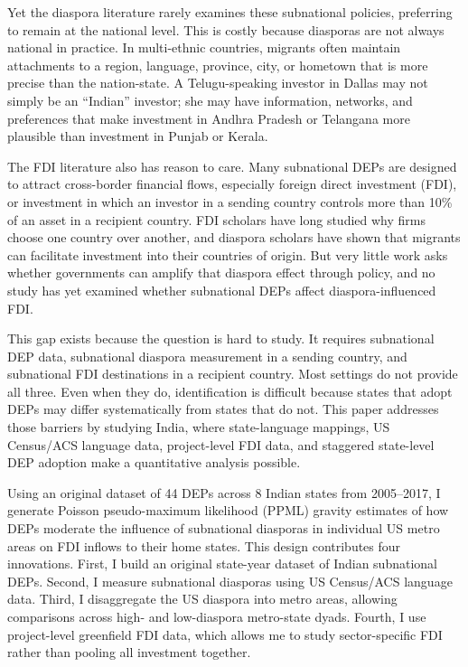 \documentclass[doublespace,nopageskip]{UVAthesis}
\begin{document}
Yet the diaspora literature rarely examines these subnational policies, preferring to remain at the national level.\citep{gazzotti_embracing_2023} This is costly because diasporas are not always national in practice. In multi-ethnic countries, migrants often maintain attachments to a region, language, province, city, or hometown that is more precise than the nation-state. A Telugu-speaking investor in Dallas may not simply be an ``Indian'' investor; she may have information, networks, and preferences that make investment in Andhra Pradesh or Telangana more plausible than investment in Punjab or Kerala.

The FDI literature also has reason to care. Many subnational DEPs are designed to attract cross-border financial flows, especially foreign direct investment (FDI), or investment in which an investor in a sending country controls more than 10\% of an asset in a recipient country. FDI scholars have long studied why firms choose one country over another, and diaspora scholars have shown that migrants can facilitate investment into their countries of origin. But very little work asks whether governments can amplify that diaspora effect through policy, and no study has yet examined whether subnational DEPs affect diaspora-influenced FDI.

This gap exists because the question is hard to study. It requires subnational DEP data, subnational diaspora measurement in a sending country, and subnational FDI destinations in a recipient country. Most settings do not provide all three. Even when they do, identification is difficult because states that adopt DEPs may differ systematically from states that do not. This paper addresses those barriers by studying India, where state-language mappings, US Census/ACS language data, project-level FDI data, and staggered state-level DEP adoption make a quantitative analysis possible.

Using an original dataset of 44 DEPs across 8 Indian states from 2005--2017, I generate Poisson pseudo-maximum likelihood (PPML) gravity estimates of how DEPs moderate the influence of subnational diasporas in individual US metro areas on FDI inflows to their home states. This design contributes four innovations. First, I build an original state-year dataset of Indian subnational DEPs. Second, I measure subnational diasporas using US Census/ACS language data. Third, I disaggregate the US diaspora into metro areas, allowing comparisons across high- and low-diaspora metro-state dyads. Fourth, I use project-level greenfield FDI data, which allows me to study sector-specific FDI rather than pooling all investment together.
\end{document}
